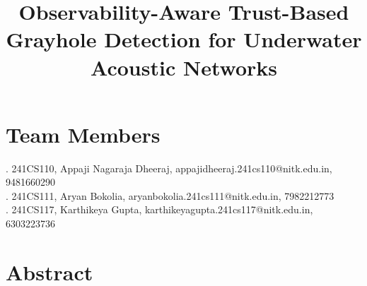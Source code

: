 \documentclass{article}
\title{\textbf{Observability-Aware Trust-Based Grayhole Detection for Underwater Acoustic Networks}}
\date{}
\begin{document}

\maketitle

\section*{Team Members}

. 241CS110, Appaji Nagaraja Dheeraj, appajidheeraj.241cs110@nitk.edu.in, 9481660290 \\
. 241CS111, Aryan Bokolia, aryanbokolia.241cs111@nitk.edu.in, 7982212773 \\
. 241CS117, Karthikeya Gupta, karthikeyagupta.241cs117@nitk.edu.in, 6303223736

\section*{Abstract}
\end{document}

